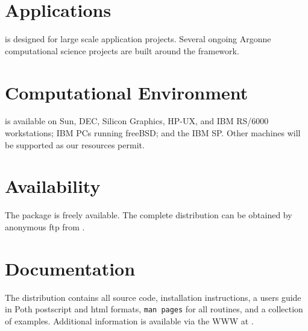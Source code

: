 \vspace{-.6cm}

\section*{Applications}
 is designed for large scale application projects. 
Several ongoing Argonne computational science projects are 
built around the  framework.

\section*{Computational Environment}
 is available on Sun, DEC, Silicon Graphics, HP-UX, and IBM
RS/6000 workstations; IBM PCs running freeBSD; and the
IBM SP. Other machines will be supported as our resources permit.

\section*{Availability}

The  package is freely available.
The complete distribution can be obtained by anonymous ftp from 
.

\section*{Documentation}

The  distribution contains all source code, 
installation instructions,
a users guide in Poth postscript and html formats, 
{\tt man pages} for all routines,
and a collection of examples.
Additional information is available via the WWW at
.
\makeinfo


